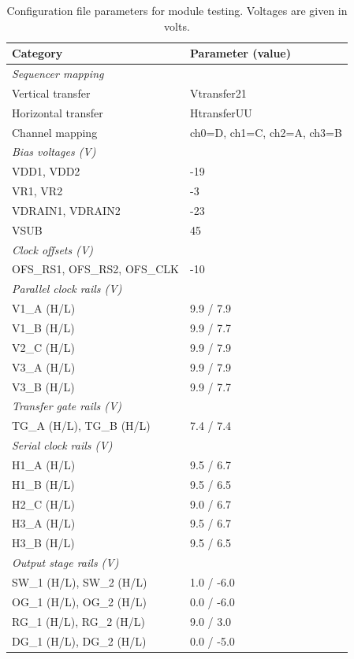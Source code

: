\documentclass[11pt]{article}
\begin{document}
\begin{table}[H]
\centering
\caption{Configuration file parameters for module testing. Voltages are given in volts.}
\label{tab:config_dm13}
\begin{tabular}{@{}ll@{}}
\toprule
\textbf{Category} & \textbf{Parameter (value)} \\
\midrule

\multicolumn{2}{l}{\textit{Sequencer mapping}} \\
Vertical transfer & Vtransfer21 \\
Horizontal transfer & HtransferUU \\
Channel mapping & ch0=D,\; ch1=C,\; ch2=A,\; ch3=B \\[4pt]

\multicolumn{2}{l}{\textit{Bias voltages (V)}} \\
VDD1, VDD2 & -19 \\
VR1, VR2 & -3 \\
VDRAIN1, VDRAIN2 & -23 \\
VSUB & 45 \\[4pt]

\multicolumn{2}{l}{\textit{Clock offsets (V)}} \\
OFS\_RS1, OFS\_RS2, OFS\_CLK & -10 \\[4pt]

\multicolumn{2}{l}{\textit{Parallel clock rails (V)}} \\
V1\_A (H/L) & 9.9 / 7.9 \\
V1\_B (H/L) & 9.9 / 7.7 \\
V2\_C (H/L) & 9.9 / 7.9 \\
V3\_A (H/L) & 9.9 / 7.9 \\
V3\_B (H/L) & 9.9 / 7.7 \\[4pt]

\multicolumn{2}{l}{\textit{Transfer gate rails (V)}} \\
TG\_A (H/L), TG\_B (H/L) & 7.4 / 7.4 \\[4pt]

\multicolumn{2}{l}{\textit{Serial clock rails (V)}} \\
H1\_A (H/L) & 9.5 / 6.7 \\
H1\_B (H/L) & 9.5 / 6.5 \\
H2\_C (H/L) & 9.0 / 6.7 \\
H3\_A (H/L) & 9.5 / 6.7 \\
H3\_B (H/L) & 9.5 / 6.5 \\[4pt]

\multicolumn{2}{l}{\textit{Output stage rails (V)}} \\
SW\_1 (H/L), SW\_2 (H/L) & 1.0 / -6.0 \\
OG\_1 (H/L), OG\_2 (H/L) & 0.0 / -6.0 \\
RG\_1 (H/L), RG\_2 (H/L) & 9.0 / 3.0 \\
DG\_1 (H/L), DG\_2 (H/L) & 0.0 / -5.0 \\

\bottomrule
\end{tabular}
\end{table}
\end{document}
